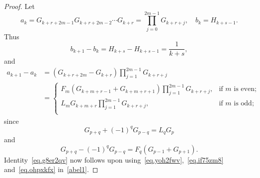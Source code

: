 \documentclass[10pt,a4paper]{amsart}
\begin{document}
	\begin{proof}
		Let
		\begin{equation}\label{eq.yoh2fwv}
			a_k  = G_{k + r + 2m - 1} G_{k + r + 2m - 2}  \cdots G_{k + r}  = \prod_{j = 0}^{2m - 1} {G_{k + r + j} },\quad b_k=H_{k+s-1}.
		\end{equation}
		Thus
		\begin{equation}\label{eq.if75zm8}
			b_{k + 1}  - b_k  = H_{k + s}  - H_{k + s - 1} = \frac{1}{{k + s}},
		\end{equation}
		and
		\begin{equation}\label{eq.ohpxkfx}
			\begin{split}
				a_{k + 1} - a_k&=\left( {G_{k + r + 2m} - G_{k + r} } \right)\prod_{j = 1}^{2m - 1} {G_{k + r + j} }\\
				&=\begin{cases}
					F_m \left( {G_{k + m + r - 1} + G_{k + m + r + 1} } \right)\prod_{j = 1}^{2m - 1} {G_{k + r + j} } ,&\text{if $m$ is even;}  \\
					L_m G_{k + m + r} \prod_{j = 1}^{2m - 1} {G_{k + r + j} } ,&\text{if $m$ is odd;}  \\
				\end{cases}
			\end{split}
		\end{equation}
		since
		\begin{equation*}
			G_{p + q} + (- 1)^q G_{p - q} = L_q G_p
		\end{equation*}
		and
		\begin{equation*}
			G_{p + q} - (- 1)^q G_{p - q} = F_q \left( G_{p - 1} + G_{p + 1} \right).
		\end{equation*}
		Identity~\eqref{eq.g8er2qv} now follows upon using~\eqref{eq.yoh2fwv},~\eqref{eq.if75zm8} and~\eqref{eq.ohpxkfx} in~\eqref{abel1}.
	\end{proof}
\end{document}
